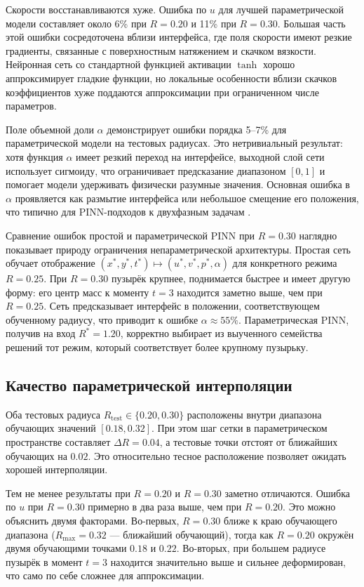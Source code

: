 \documentclass[12pt,a4paper]{article}
\begin{document}
Скорости восстанавливаются хуже. Ошибка по \(u\) для лучшей параметрической
модели составляет около 6\% при \(R=0.20\) и 11\% при \(R=0.30\). Большая часть
этой ошибки сосредоточена вблизи интерфейса, где поля скорости имеют резкие
градиенты, связанные с поверхностным натяжением и скачком вязкости. Нейронная
сеть со стандартной функцией активации \(\tanh\) хорошо аппроксимирует гладкие
функции, но локальные особенности вблизи скачков коэффициентов хуже поддаются
аппроксимации при ограниченном числе параметров.

Поле объемной доли \(\alpha\) демонстрирует ошибки порядка 5--7\% для
параметрической модели на тестовых радиусах. Это нетривиальный результат: хотя
функция \(\alpha\) имеет резкий переход на интерфейсе, выходной слой сети
использует сигмоиду, что ограничивает предсказание диапазоном \([0,1]\) и
помогает модели удерживать физически разумные значения. Основная ошибка в
\(\alpha\) проявляется как размытие интерфейса или небольшое смещение его
положения, что типично для PINN-подходов к двухфазным задачам
\cite{Buhendwa2021}.

Сравнение ошибок простой и параметрической PINN при \(R=0.30\) наглядно
показывает природу ограничения непараметрической архитектуры. Простая сеть
обучает отображение \((x^*,y^*,t^*)\mapsto(u^*,v^*,p^*,\alpha)\) для конкретного
режима \(R=0.25\). При \(R=0.30\) пузырёк крупнее, поднимается быстрее и имеет
другую форму: его центр масс к моменту \(t=3\) находится заметно выше, чем при
\(R=0.25\). Сеть предсказывает интерфейс в положении, соответствующем обученному
радиусу, что приводит к ошибке \(\alpha \approx 55\%\). Параметрическая PINN,
получив на вход \(R^*=1.20\), корректно выбирает из выученного семейства решений
тот режим, который соответствует более крупному пузырьку.

\subsection{Качество параметрической интерполяции}

Оба тестовых радиуса \(R_{\mathrm{test}}\in\{0.20,0.30\}\) расположены внутри
диапазона обучающих значений \([0.18, 0.32]\). При этом шаг сетки в
параметрическом пространстве составляет \(\Delta R = 0.04\), а тестовые точки
отстоят от ближайших обучающих на \(0.02\). Это относительно тесное расположение
позволяет ожидать хорошей интерполяции.

Тем не менее результаты при \(R=0.20\) и \(R=0.30\) заметно отличаются.
Ошибка по \(u\) при \(R=0.30\) примерно в два раза выше, чем при \(R=0.20\).
Это можно объяснить двумя факторами. Во-первых, \(R=0.30\) ближе к краю
обучающего диапазона (\(R_{\max}=0.32\) --- ближайший обучающий), тогда как
\(R=0.20\) окружён двумя обучающими точками \(0.18\) и \(0.22\). Во-вторых,
при большем радиусе пузырёк в момент \(t=3\) находится значительно выше и
сильнее деформирован, что само по себе сложнее для аппроксимации.
\end{document}
